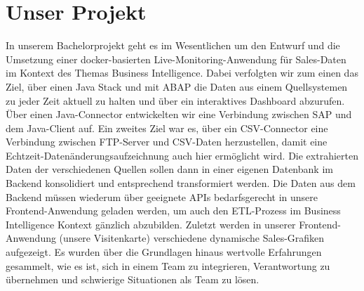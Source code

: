 \section*{Unser Projekt}
In unserem Bachelorprojekt geht es im Wesentlichen um den Entwurf und die Umsetzung einer docker-basierten Live-Monitoring-Anwendung für Sales-Daten im Kontext des Themas Business Intelligence.
\newline
\newline
Dabei verfolgten wir zum einen das Ziel, über einen Java Stack und mit ABAP die Daten aus einem Quellsystemen zu jeder Zeit aktuell zu halten und über ein interaktives Dashboard abzurufen. Über einen Java-Connector entwickelten wir eine Verbindung zwischen SAP und dem Java-Client auf. Ein zweites Ziel war es, über ein CSV-Connector eine Verbindung zwischen FTP-Server und CSV-Daten herzustellen, damit eine Echtzeit-Datenänderungsaufzeichnung auch hier ermöglicht wird.
\newline
Die extrahierten Daten der verschiedenen Quellen sollen dann in einer eigenen Datenbank im Backend konsolidiert und entsprechend transformiert werden.
\newline
\newline
Die Daten aus dem Backend müssen wiederum über geeignete APIs bedarfsgerecht in unsere Frontend-Anwendung geladen werden, um auch den ETL-Prozess im Business Intelligence Kontext gänzlich abzubilden.
\newline
\newline
Zuletzt werden in unserer Frontend-Anwendung (unsere Visitenkarte) verschiedene dynamische Sales-Grafiken aufgezeigt.
\newline
Es wurden über die Grundlagen hinaus wertvolle Erfahrungen gesammelt, wie es ist, sich in einem Team zu integrieren, Verantwortung zu übernehmen und schwierige Situationen als Team zu lösen.

